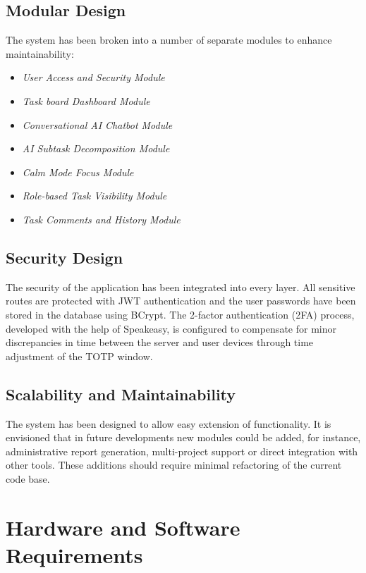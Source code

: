 \documentclass[conference]{IEEEtran}
\begin{document}
\subsection{Modular Design}
The system has been broken into a number of separate modules to enhance maintainability:
\begin{itemize}
    \item \textit{User Access and Security Module}
    \item \textit{Task board Dashboard Module}
    \item \textit{Conversational AI Chatbot Module}
    \item \textit{AI Subtask Decomposition Module}
    \item \textit{Calm Mode Focus Module}
    \item \textit{Role-based Task Visibility Module}
    \item \textit{Task Comments and History Module}
\end{itemize}

\subsection{Security Design}
The security of the application has been integrated into every layer. All sensitive routes are protected with JWT authentication and the user passwords have been stored in the database using BCrypt. The 2-factor authentication (2FA) process, developed with the help of Speakeasy, is configured to compensate for minor discrepancies in time between the server and user devices through time adjustment of the TOTP window.

\subsection{Scalability and Maintainability}
The system has been designed to allow easy extension of functionality. It is envisioned that in future developments new modules could be added, for instance, administrative report generation, multi-project support or direct integration with other tools. These additions should require minimal refactoring of the current code base.

\section{Hardware and Software Requirements}
\end{document}
